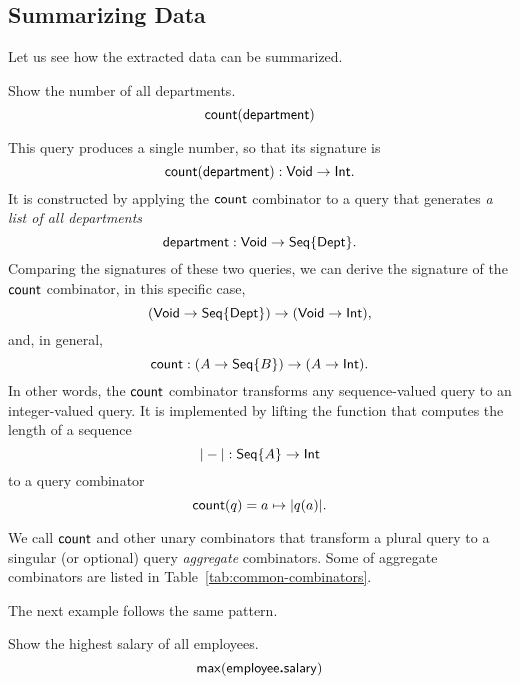 \subsection*{Summarizing Data}

Let us see how the extracted data can be summarized.

\begin{demo}
    \label{ex:count-department}
    Show the number of all departments.
    \begin{equation*}
        \mathsf{count}(\mathsf{department})
    \end{equation*}
\end{demo}

This query produces a single number, so that its signature is
\begin{equation*}
    \mathsf{count}(\mathsf{department}) : \mathsf{Void} \to \mathsf{Int}.
\end{equation*}
It is constructed by applying the $\mathsf{count}$ combinator to a query that generates
\emph{a list of all departments}
\begin{equation*}
    \mathsf{department} : \mathsf{Void} \to \mathsf{Seq}{\left\{\mathsf{Dept}\right\}}.
\end{equation*}
Comparing the signatures of these two queries, we can derive the signature of
the $\mathsf{count}$ combinator, in this specific case,
\begin{equation*}
    (\mathsf{Void} \to \mathsf{Seq}{\left\{\mathsf{Dept}\right\}}) \to (\mathsf{Void} \to \mathsf{Int}),
\end{equation*}
and, in general,
\begin{equation*}
    \mathsf{count}: (A \to \mathsf{Seq}{\left\{B\right\}}) \to (A \to \mathsf{Int}).
\end{equation*}
In other words, the $\mathsf{count}$ combinator transforms any sequence-valued query
to an integer-valued query.  It is implemented by lifting the function that
computes the length of a sequence
\begin{equation*}
    |-| : \mathsf{Seq}{\left\{A\right\}} \to \mathsf{Int}
\end{equation*}
to a query combinator
\begin{equation*}
    \mathsf{count}(q) = a \mapsto |q(a)|.
\end{equation*}

We call $\mathsf{count}$ and other unary combinators that transform a plural query to a
singular (or optional) query \emph{aggregate} combinators.  Some of aggregate
combinators are listed in Table~\ref{tab:common-combinators}.

The next example follows the same pattern.

\begin{demo}
    \label{ex:max-employee-salary}
    Show the highest salary of all employees.
    \begin{equation*}
        \mathsf{max}(\mathsf{employee}\boldsymbol{.}\mathsf{salary})
    \end{equation*}
\end{demo}

